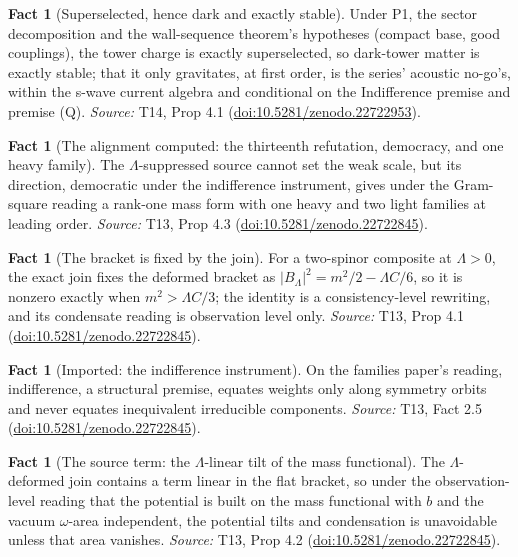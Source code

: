 \documentclass[11pt]{article}
\theoremstyle{definition}
\newtheorem{fact}[theorem]{Fact}
\theoremstyle{plain}
\begin{document}
\begin{fact}[Superselected, hence dark and exactly stable]\label{c:dark-matter.superselected-hence-dark-exactly-stable}
Under P1, the sector decomposition and the wall-sequence theorem's hypotheses (compact base, good couplings), the tower charge is exactly superselected, so dark-tower matter is exactly stable; that it only gravitates, at first order, is the series' acoustic no-go's, within the s-wave current algebra and conditional on the Indifference premise and premise (Q).
\emph{Source:} T14, Prop 4.1 (\href{https://doi.org/10.5281/zenodo.22722953}{doi:10.5281/zenodo.22722953}).
\end{fact}

\begin{fact}[The alignment computed: the thirteenth refutation, democracy, and one heavy family]\label{c:families.alignment-computed-thirteenth-refutation-democracy-one}
The $\Lambda$-suppressed source cannot set the weak scale, but its direction, democratic under the indifference instrument, gives under the Gram-square reading a rank-one mass form with one heavy and two light families at leading order.
\emph{Source:} T13, Prop 4.3 (\href{https://doi.org/10.5281/zenodo.22722845}{doi:10.5281/zenodo.22722845}).
\end{fact}

\begin{fact}[The bracket is fixed by the join]\label{c:families.bracket-fixed-join}
For a two-spinor composite at $\Lambda > 0$, the exact join fixes the deformed bracket as $|B_{\Lambda}|^{2} = m^{2}/2 - \Lambda C/6$, so it is nonzero exactly when $m^{2} > \Lambda C/3$; the identity is a consistency-level rewriting, and its condensate reading is observation level only.
\emph{Source:} T13, Prop 4.1 (\href{https://doi.org/10.5281/zenodo.22722845}{doi:10.5281/zenodo.22722845}).
\end{fact}

\begin{fact}[Imported: the indifference instrument]\label{c:families.imported-indifference-instrument}
On the families paper's reading, indifference, a structural premise, equates weights only along symmetry orbits and never equates inequivalent irreducible components.
\emph{Source:} T13, Fact 2.5 (\href{https://doi.org/10.5281/zenodo.22722845}{doi:10.5281/zenodo.22722845}).
\end{fact}

\begin{fact}[The source term: the $\Lambda$-linear tilt of the mass functional]\label{c:families.source-term-linear-tilt-mass-functional}
The $\Lambda$-deformed join contains a term linear in the flat bracket, so under the observation-level reading that the potential is built on the mass functional with $b$ and the vacuum $\omega$-area independent, the potential tilts and condensation is unavoidable unless that area vanishes.
\emph{Source:} T13, Prop 4.2 (\href{https://doi.org/10.5281/zenodo.22722845}{doi:10.5281/zenodo.22722845}).
\end{fact}
\end{document}
